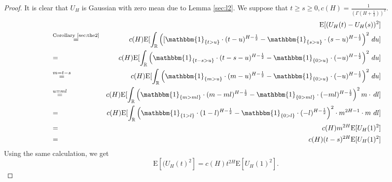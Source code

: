 \documentclass[a4paper, twoside, 11pt]{article}
\theoremstyle{definition}
\newcommand{\brkt}[1]{\left({#1} \right)}
\begin{document}
\begin{proof}
  It is clear that $U_H$ is Gaussian with zero mean due to Lemma \ref{sec:l2}. We suppose that $t \ge s \ge 0,  c(H)=\frac{1}{(\Gamma(H+\frac{1}{2}))^2}$.
  \begin{eqnarray}
	&&\mathrm{E}[(U_H(t) - U_H(s))^2]\nonumber\\
	&\overset{\text{Corollary \ref{sec:the2}}}{=}& c(H)\mathrm{E}[\int_{\mathbb{R}} \brkt{[\mathbbm{1}_{\{t > u\}}\cdot(t-u)^{H-\frac{1}{2}}  - \mathbbm{1}_{\{s > u\}}\cdot(s-u)^{H-\frac{1}{2}}}^2 \,\mathop{du}]\nonumber\\
	&=& c(H)\mathrm{E}[\int_{\mathbb{R}} \brkt{\mathbbm{1}_{\{t-s > u\}}\cdot(t-s-u)^{H-\frac{1}{2}}  - \mathbbm{1}_{\{0 > u\}}\cdot(-u)^{H-\frac{1}{2}}}^2 \,\mathop{du}]\nonumber\\
	&\overset{m=t-s}{=}& c(H)\mathrm{E}[\int_{\mathbb{R}} \brkt{\mathbbm{1}_{\{m > u\}}\cdot(m-u)^{H-\frac{1}{2}}  - \mathbbm{1}_{\{0 > u\}}\cdot(-u)^{H-\frac{1}{2}}}^2 \,\mathop{du}]\nonumber\\
	&\overset{u=ml}{=}& c(H)\mathrm{E}[\int_{\mathbb{R}} \brkt{\mathbbm{1}_{\{m > ml\}}\cdot(m-ml)^{H-\frac{1}{2}}  - \mathbbm{1}_{\{0 > ml\}}\cdot(-ml)^{H-\frac{1}{2}}}^2 m\cdot\,\mathop{dl}]\nonumber\\
	&=& c(H)\mathrm{E}[\int_{\mathbb{R}} \brkt{\mathbbm{1}_{\{1 > l \}}\cdot(1-l)^{H-\frac{1}{2}}  - \mathbbm{1}_{\{0 > l\}}\cdot(-l)^{H-\frac{1}{2}}}^2 \cdot m^{2H-1}\cdot m\,\mathop{dl}]\nonumber\\
	&=& c(H)m^{2H}\mathrm{E}[U_H(1)^2]\nonumber\\
	&=& c(H)(t-s)^{2H}\mathrm{E}[U_H(1)^2]
	\label{sec:eqn1}
  \end{eqnarray}
  Using the same calculation, we get
  \begin{equation}
	\mathrm{E}[(U_H(t)^2] = c(H)t^{2H}\mathrm{E}[U_H(1)^2].
	\label{sec:eqn2}
  \end{equation}


\end{proof}
\end{document}
